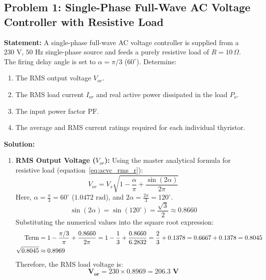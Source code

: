 \documentclass[11pt,a4paper]{article}
\begin{document}
\subsection{Problem 1: Single-Phase Full-Wave AC Voltage Controller with Resistive Load}
\begin{examplebox}
\textbf{Statement:} A single-phase full-wave AC voltage controller is supplied from a $230\text{ V}$, $50\text{ Hz}$ single-phase source and feeds a purely resistive load of $R = 10\,\Omega$. The firing delay angle is set to $\alpha = \pi/3$ ($60^\circ$). Determine:
\begin{enumerate}
  \item The RMS output voltage $V_{or}$.
  \item The RMS load current $I_{or}$ and real active power dissipated in the load $P_o$.
  \item The input power factor $\text{PF}$.
  \item The average and RMS current ratings required for each individual thyristor.
\end{enumerate}

\tcblower
\textbf{Solution:}
\begin{enumerate}
  \item \textbf{RMS Output Voltage ($V_{or}$):}
  Using the master analytical formula for resistive load (equation~\eqref{eq:acvc_rms_r}):
  \begin{equation*}
  V_{or} = V_s \sqrt{1 - \frac{\alpha}{\pi} + \frac{\sin(2\alpha)}{2\pi}}
  \end{equation*}
  Here, $\alpha = \frac{\pi}{3} = 60^\circ$ ($1.0472\text{ rad}$), and $2\alpha = \frac{2\pi}{3} = 120^\circ$.
  \begin{equation*}
  \sin(2\alpha) = \sin(120^\circ) = \frac{\sqrt{3}}{2} \approx 0.8660
  \end{equation*}
  Substituting the numerical values into the square root expression:
  \begin{align*}
  \text{Term} &= 1 - \frac{\pi/3}{\pi} + \frac{0.8660}{2\pi} = 1 - \frac{1}{3} + \frac{0.8660}{6.2832} = \frac{2}{3} + 0.1378 = 0.6667 + 0.1378 = 0.8045 \notag\\
  \sqrt{0.8045} &\approx 0.8969
  \end{align*}
  Therefore, the RMS load voltage is:
  \begin{equation*}
  \mathbf{V_{or}} = 230 \times 0.8969 = \mathbf{206.3\text{ V}}
  \end{equation*}


\end{enumerate}
\end{examplebox}
\end{document}
